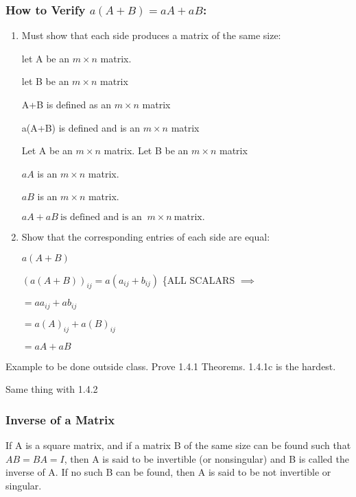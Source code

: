 \subsubsection{How to Verify $a(A+B) = aA + aB$:}%
\label{ssub:verify_}
\begin{enumerate}
	\item Must show that each side produces a matrix of the same size:

let A be an $m\times n$ matrix.

let B be an $m\times n$ matrix

A+B is defined as an $m\times n$ matrix

a(A+B) is defined and is an $m\times n$ matrix

Let A be an $m\times n$ matrix. Let B be an $m\times n$ matrix

$aA$ is an $m\times n$ matrix.

 $aB$ is an $m\times n$ matrix.

 $\boxed{aA + aB \:\text{is defined and is an }\:m\times n \:\text{matrix.}\:}$
\item Show that the corresponding entries of each side are equal:

	$a(A+B)$

	$(a(A+B))_{ij} = a ( a_{ij}+ b_{ij})$ \{ALL SCALARS $\implies$

		$= aa_{ij} + ab_{ij}$

		$= a(A)_{ij} + a (B)_{ij}$

		$= aA + aB$
\end{enumerate}


\begin{example}[Theorem 1.4.1]
	Example to be done outside class. Prove 1.4.1 Theorems. 1.4.1c is the hardest.

	Same thing with 1.4.2
\end{example}

\subsubsection{Inverse of a Matrix}%
\label{ssub:inverse_of_a_matrix}

\begin{definition}
	If A is a square matrix, and if a matrix B of the same size can be found
	such that $AB = BA = I$,
	then A is said to be invertible (or nonsingular) and B is called the inverse
	of A. If no such B can be found, then A is said to be not invertible or
	singular.
\end{definition}













\newpage



